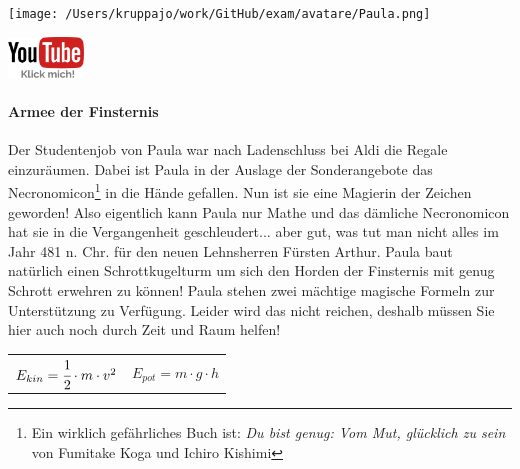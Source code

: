 \documentclass[a4paper, 9pt]{scrartcl}\usepackage[]{graphicx}\usepackage[]{xcolor}
\begin{document}
 
\ifcollection
\begin{flushright}
\tiny\vspace{-3Ex}
\textbf{\examinhaltstart}
\exammodulemathstat
\vspace{-4Ex}
\end{flushright}
\begin{minipage}[t]{0.5\textwidth}
\texttt{[image: /Users/kruppajo/work/GitHub/exam/avatare/Paula.png]}
\end{minipage}
\begin{minipage}[t]{0.5\textwidth}
\hfill
\href{https://youtu.be/Bbu6n8MXxQk}{\includegraphics[width = 2cm]{img/youtube}}
\end{minipage}
\fi



\ifcollection
\paragraph{Armee der Finsternis}
\fi



Der Studentenjob von Paula war nach Ladenschluss bei Aldi die Regale einzuräumen. Dabei ist Paula in der Auslage der Sonderangebote das Necronomicon\footnote{Ein wirklich gefährliches Buch ist: \textit{Du bist genug: Vom Mut, glücklich zu sein} von Fumitake Koga und Ichiro Kishimi} in die Hände gefallen. Nun ist sie eine Magierin der Zeichen geworden! Also eigentlich kann Paula nur Mathe und das dämliche Necronomicon hat sie in die Vergangenheit geschleudert... aber gut, was tut man nicht alles im Jahr 481 n. Chr. für den neuen Lehnsherren Fürsten Arthur. Paula baut natürlich einen Schrottkugelturm um sich den
Horden der Finsternis mit genug Schrott erwehren zu können! Paula stehen zwei mächtige magische Formeln zur Unterstützung zu Verfügung. Leider wird das nicht reichen, deshalb müssen Sie hier auch noch durch Zeit und Raum helfen!

\begin{center}
  \begin{tabular}{cc}
    $E_{kin} = \cfrac{1}{2}\cdot m \cdot v^2$ & $E_{pot} = m \cdot g \cdot h$\\
  \end{tabular}
\end{center}
\end{document}
